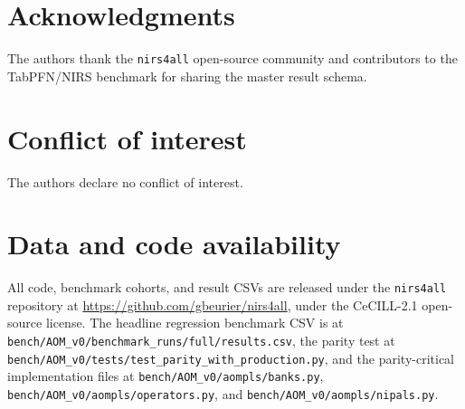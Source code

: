 \documentclass[review,a4paper]{elsarticle}
\newcommand{\nirsfourall}{\texttt{nirs4all}\xspace}
\begin{document}
\section*{Acknowledgments}
The authors thank the \nirsfourall open-source community and contributors
to the TabPFN/NIRS benchmark for sharing the master result schema.

\section*{Conflict of interest}
The authors declare no conflict of interest.

\section*{Data and code availability}
All code, benchmark cohorts, and result CSVs are released under the
\nirsfourall repository at \url{https://github.com/gbeurier/nirs4all},
under the CeCILL-2.1 open-source license. The headline regression
benchmark CSV is at
\verb|bench/AOM_v0/benchmark_runs/full/results.csv|, the parity test
at \verb|bench/AOM_v0/tests/test_parity_with_production.py|, and the
parity-critical implementation files at
\verb|bench/AOM_v0/aompls/banks.py|,
\verb|bench/AOM_v0/aompls/operators.py|, and
\verb|bench/AOM_v0/aompls/nipals.py|.



\end{document}

